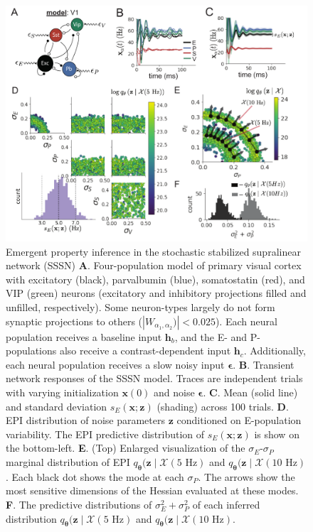 \documentclass[11pt]{article}
\begin{document}
\begin{figure}
\vspace{-1cm}
\begin{center}
\includegraphics[scale=0.8]{figures/fig3/fig3.pdf}
\end{center}
\vspace{-1cm}
\caption{\small Emergent property inference in the stochastic stabilized supralinear network (SSSN)
\textbf{A}.  Four-population model of primary visual cortex with excitatory (black), parvalbumin (blue), somatostatin (red), and VIP (green) neurons (excitatory and inhibitory projections filled and unfilled, respectively).   
Some neuron-types largely do not form synaptic projections to others ($|W_{\alpha_1, \alpha_2})| < 0.025$).
Each neural population receives a baseline input $\mathbf{h}_b$, and the E- and P-populations also receive a contrast-dependent input $\mathbf{h}_c$.
Additionally, each neural population receives a slow noisy input $\bm{\epsilon}$.
\textbf{B}. Transient network responses of the SSSN model. Traces are independent trials with varying initialization $\mathbf{x}(0)$ and noise $\bm{\epsilon}$. 
\textbf{C}. Mean (solid line) and standard deviation $s_E(\mathbf{x}; \mathbf{z})$ (shading)  across 100 trials.
\textbf{D}. EPI distribution of noise parameters $\mathbf{z}$ conditioned on E-population variability.
The EPI predictive distribution of $s_E(\mathbf{x}; \mathbf{z})$ is show on the bottom-left.
\textbf{E}. (Top) Enlarged visualization of the $\sigma_E$-$\sigma_P$ marginal distribution of EPI $q_{\bm{\theta}}(\mathbf{z} \mid \mathcal{X}(5\text{ Hz})$ and $q_{\bm{\theta}}(\mathbf{z} \mid \mathcal{X}(10\text{ Hz})$.
Each black dot shows the mode at each $\sigma_P$.
The arrows show the most sensitive dimensions of the Hessian evaluated at these modes.
\textbf{F}. The predictive distributions of $\sigma_E^2 + \sigma_P^2$ of each inferred distribution $q_{\bm{\theta}}(\mathbf{z} \mid \mathcal{X}(5\text{ Hz})$ and $q_{\bm{\theta}}(\mathbf{z} \mid \mathcal{X}(10\text{ Hz})$.
}
 \label{fig:V1}
\end{figure}
\end{document}
